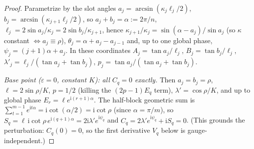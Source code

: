 \begin{proof}
        \leanok
  Parametrize by the slot angles $a_j = \arcsin(\kappa_j\ell_j/2)$,
  $b_j = \arcsin(\kappa_{j+1}\ell_j/2)$, so $a_j + b_j = \alpha := 2\pi/n$,
  $\ell_j = 2\sin a_j/\kappa_j = 2\sin b_j/\kappa_{j+1}$, hence
  $\kappa_{j+1}/\kappa_j = \sin(\alpha - a_j)/\sin a_j$ (so $\kappa$ constant
  $\iff a_j \equiv \rho$), $\theta_j = \alpha + a_j - a_{j-1}$ and, up to one
  global phase, $\psi_j = (j+1)\alpha + a_j$. In these coordinates
  $A_j = \tan a_j/\ell_j$, $B_j = \tan b_j/\ell_j$,
  $\lambda'_j = \ell_j/(\tan a_j + \tan b_j)$,
  $p_j = \tan a_j/(\tan a_j + \tan b_j)$.

  \emph{Base point ($\varepsilon = 0$, constant $K$): all $C_q = 0$ exactly.}
  Then $a_j = b_j = \rho$, $\ell = 2\sin\rho/K$, $p = 1/2$ (killing the
  $(2p-1)E_q$ term), $\lambda' = \cos\rho/K$, and up to global phase
  $E_r = \ell e^{\mathrm{i}(r+1)\alpha}$. The half-block geometric sum is
  $\sum_{t=1}^{m-1} e^{\mathrm{i}t\alpha} = \mathrm{i}\cot(\alpha/2) =
  \mathrm{i}\cot\rho$ (since $\alpha = \pi/m$), so
  $S_q = \ell\,\mathrm{i}\cot\rho\, e^{\mathrm{i}(q+1)\alpha} =
  2\mathrm{i}\lambda' e^{\mathrm{i}\psi_q}$ and
  $C_q = 2\lambda' e^{\mathrm{i}\psi_q} + \mathrm{i}S_q = 0$. (This grounds the
  perturbation: $C_q(0) = 0$, so the first derivative $V_q$ below is
  gauge-independent.)


\end{proof}
